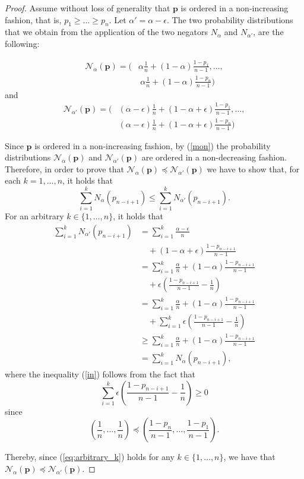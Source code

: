 \documentclass[pdflatex,sn-basic,iicol]{sn-jnl}%
\theoremstyle{thmstyleone}%
\theoremstyle{thmstyletwo}%
\theoremstyle{thmstylethree}%
\newcommand{\N}{\mathcal{N}}
\newcommand{\bp}{\mathbf{p}}
\begin{document}
\begin{proof}
Assume without loss of generality that $\bp$ is ordered in a non-increasing fashion, that is, $p_1\geq\dots\geq p_n$. Let $\alpha'=\alpha-\epsilon$.
The two probability distributions that we obtain from the application of the two negators
 $N_\alpha$ and $N_{\alpha'}$, are the following:

\begin{align*}
     \N_\alpha(\bp) = \Biggl(&\alpha\frac{1}{n} + (1-\alpha)\frac{1-p_1}{n-1},\dots,\\&\ \alpha\frac{1}{n} + (1-\alpha)\frac{1-p_n}{n-1}\Biggr)
\end{align*}
and
\begin{align*}
    \N_{\alpha'}(\bp) = \Biggl(&(\alpha-\epsilon)\frac{1}{n} + (1-\alpha+\epsilon)\frac{1-p_1}{n-1},\dots,\\&(\alpha-\epsilon)\frac{1}{n} + (1-\alpha + \epsilon)\frac{1-p_n}{n-1}\Biggr)
\end{align*}

Since $\bp$ is ordered in a non-increasing fashion, by (\ref{mon}) the probability distributions 
$\N_\alpha(\bp)$ and $\N_{\alpha'}(\bp)$ are ordered in a non-decreasing fashion. Therefore, in order to prove that $\N_\alpha(\bp)\preceq \N_{\alpha'}(\bp)$ we have to show that, for each $k=1,\dots,n$, it holds that
\begin{equation}
    \sum_{i=1}^k N_{\alpha}(p_{n-i+1}) \leq \sum_{i=1}^kN_{\alpha'}(p_{n-i+1}).\label{eq:to_prove}
\end{equation}
For an arbitrary $k\in\{1,\dots,n\}$, it holds that
\begin{align}
    \sum_{i=1}^kN_{\alpha'}(p_{n-i+1}) &= \sum_{i=1}^k \frac{\alpha - \epsilon}{n} \nonumber\\&\quad+ (1-\alpha+\epsilon)\frac{1-p_{n-i+1}}{n-1}\nonumber\\
    &=\sum_{i=1}^k \frac{\alpha}{n} + (1-\alpha)\frac{1-p_{n-i+1}}{n-1}\nonumber\\&\quad+ \epsilon\left(\frac{1-p_{n-i+1}}{n-1} - \frac{1}{n}\right)\nonumber\\
    &=\sum_{i=1}^k \frac{\alpha}{n} + (1-\alpha)\frac{1-p_{n-i+1}}{n-1}\nonumber\\&\quad+ \sum_{i=1}^k \epsilon\left(\frac{1-p_{n-i+1}}{n-1} - \frac{1}{n}\right)\nonumber\\
    &\geq \sum_{i=1}^k \frac{\alpha}{n} + (1-\alpha)\frac{1-p_{n-i+1}}{n-1}\label{in}\\
    &=\sum_{i=1}^k N_{\alpha}(p_{n-i+1}),\label{eq:arbitrary_k}
\end{align}
where the inequality (\ref{in}) follows from the fact that 
$$\sum_{i=1}^k \epsilon\left(\frac{1-p_{n-i+1}}{n-1} - \frac{1}{n}\right)\geq 0$$ since 
$$\left(\frac{1}{n},\dots,\frac{1}{n}\right) \preceq \left(\frac{1-p_n}{n-1},\dots,\frac{1-p_1}{n-1}\right).$$

Thereby, since (\ref{eq:arbitrary_k}) holds for any $k\in\{1,\dots,n\}$, we have that $\N_\alpha(\bp)\preceq\N_{\alpha'}(\bp)$.
\end{proof}
\end{document}
